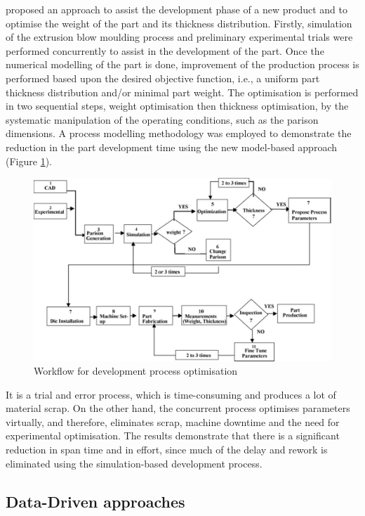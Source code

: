 \citet{attar2008manufacturing} proposed an approach to assist the development phase of a new product and to optimise the weight of the part and its thickness distribution. Firstly, simulation of the extrusion blow moulding process and preliminary experimental trials were performed concurrently to assist in the development of the part. Once the numerical modelling of the part is done, improvement of the production process is performed based upon the desired objective function, i.e., a uniform part thickness distribution and/or minimal part weight. The optimisation is performed in two sequential steps, weight optimisation then thickness optimisation, by the systematic manipulation of the operating conditions, such as the parison dimensions. A process modelling methodology was employed to demonstrate the reduction in the part development time using the new model-based approach (Figure \ref{fig:workflow_development_process_optimisation}).
\begin{figure}
\centerline{\includegraphics[scale=0.6]{images/chapter_2/optimisation_flow.png}}
\caption{Workflow for development process optimisation \citep{attar2008manufacturing}}
\label{fig:workflow_development_process_optimisation}
\end{figure}
It is a trial and error process, which is time-consuming and produces a lot of material scrap. On the other hand, the concurrent process optimises parameters virtually, and therefore, eliminates scrap, machine downtime and the need for experimental optimisation. The results demonstrate that there is a significant reduction in span time and in effort, since much of the delay and rework is eliminated using the simulation-based development process.


\subsection{Data-Driven approaches} \label{Data-driven approaches}

